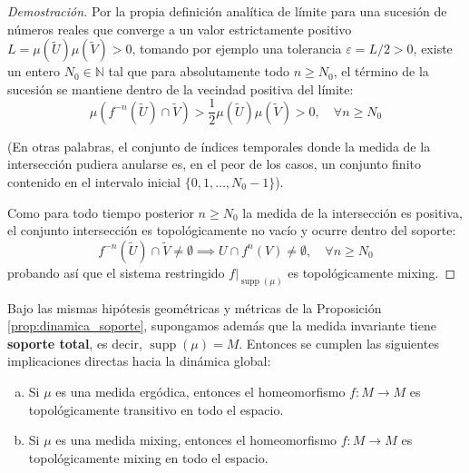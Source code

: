\begin{proof}[Demostración]
	Por la propia definición analítica de límite para una sucesión de números reales que converge a un valor estrictamente positivo $L = \mu(\tilde{U})\mu(\tilde{V}) > 0$, tomando por ejemplo una tolerancia $\varepsilon = L/2 > 0$, existe un entero $N_0 \in \mathbb{N}$ tal que para absolutamente todo $n \ge N_0$, el término de la sucesión se mantiene dentro de la vecindad positiva del límite:
	$$ \mu(f^{-n}(\tilde{U}) \cap \tilde{V}) > \frac{1}{2} \mu(\tilde{U})\mu(\tilde{V}) > 0, \quad \forall n \ge N_0 $$
	
	(En otras palabras, el conjunto de índices temporales donde la medida de la intersección pudiera anularse es, en el peor de los casos, un conjunto finito contenido en el intervalo inicial $\{0, 1, \dots, N_0-1\}$).
	
	Como para todo tiempo posterior $n \ge N_0$ la medida de la intersección es positiva, el conjunto intersección es topológicamente no vacío y ocurre dentro del soporte:
	$$ f^{-n}(\tilde{U}) \cap \tilde{V} \neq \emptyset \implies U \cap f^n(V) \neq \emptyset, \quad \forall n \ge N_0 $$
	probando así que el sistema restringido $f|_{\operatorname{supp}(\mu)}$ es topológicamente mixing.
\end{proof}

\begin{corolario} \label{cor:soporte_total}
	Bajo las mismas hipótesis geométricas y métricas de la Proposición \ref{prop:dinamica_soporte}, supongamos además que la medida invariante tiene \textbf{soporte total}, es decir, $\operatorname{supp}(\mu) = M$. Entonces se cumplen las siguientes implicaciones directas hacia la dinámica global:
	\begin{enumerate}[a)]
		\item Si $\mu$ es una medida ergódica, entonces el homeomorfismo $f: M \to M$ es topológicamente transitivo en todo el espacio.
		\item Si $\mu$ es una medida mixing, entonces el homeomorfismo $f: M \to M$ es topológicamente mixing en todo el espacio.
	\end{enumerate}
\end{corolario}

